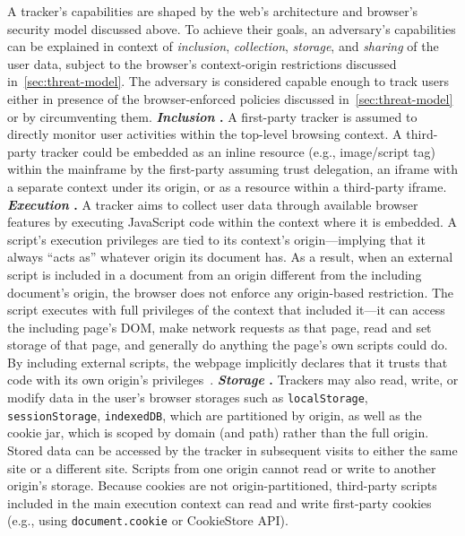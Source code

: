 %
A tracker's capabilities are shaped by the web's architecture and browser's security model discussed above.
%
To achieve their goals, an adversary's capabilities can be explained in context of \textit{inclusion}, \textit{collection}, \textit{storage}, and \textit{sharing} of the user data, subject to the browser's context-origin restrictions discussed in~\autoref{sec:threat-model}.
%
The adversary is considered capable enough to track users either in presence of the browser-enforced policies discussed in~\autoref{sec:threat-model} or by circumventing them.
%
\textbf{\textit{Inclusion} \symInclusion.}
%
A first-party tracker is assumed to directly monitor user activities within the top-level browsing context.
%
A third-party tracker could be embedded as an inline resource (e.g., image/script tag) within the mainframe by the first-party assuming trust delegation, an iframe with a separate context under its origin, or as a resource within a third-party iframe.
%
\textbf{\textit{Execution} \symExecution.}
%
A tracker aims to collect user data through available browser features by executing JavaScript code within the context where it is embedded.
%
A script's execution privileges are tied to its context’s origin---implying that it always ``acts as'' whatever origin its document has.
%
As a result, when an external script is included in a document from an origin different from the including document's origin, the browser does not enforce any origin-based restriction.
%
The script executes with full privileges of the context that included it---it can access the including page’s DOM, make network requests as that page, read and set storage of that page, and generally do anything the page’s own scripts could do.
%
By including external scripts, the webpage implicitly declares that it trusts that code with its own origin’s privileges~\cite{TrackingPreventionWebKit2020}.
%
\textbf{\textit{Storage} \symStorage.}
%
Trackers may also read, write, or modify data in the user's browser storages such as \texttt{localStorage}, \texttt{sessionStorage}, \texttt{indexedDB}, which are partitioned by origin, as well as the cookie jar, which is scoped by domain (and path) rather than the full origin.
%
Stored data can be accessed by the tracker in subsequent visits to either the same site or a different site.
%
Scripts from one origin cannot read or write to another origin’s storage.
%
Because cookies are not origin-partitioned, third-party scripts included in the main execution context can read and write first-party cookies (e.g., using \texttt{document.cookie} or CookieStore API).
